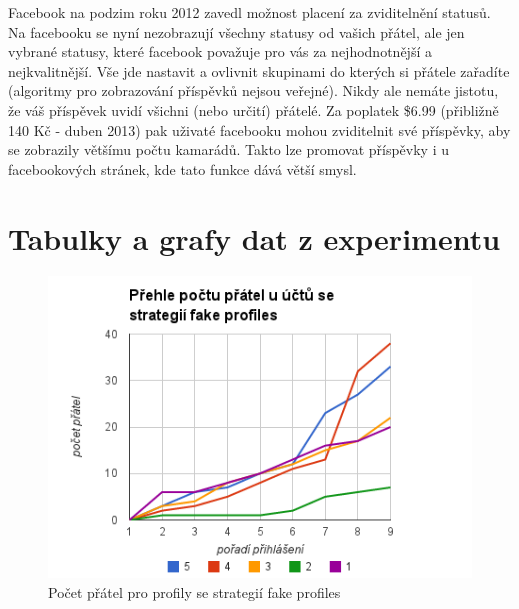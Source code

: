 \documentclass[thesis=M,czech]{FITthesis}[2013/05/10]
\begin{document}
Facebook na podzim roku 2012 zavedl možnost placení za zviditelnění statusů. Na facebooku se nyní nezobrazují všechny statusy od vašich přátel, ale jen vybrané statusy, které facebook považuje pro vás za nejhodnotnější a nejkvalitnější. Vše jde nastavit a ovlivnit skupinami do kterých si přátele zařadíte (algoritmy pro zobrazování příspěvků nejsou veřejné). Nikdy ale nemáte jistotu, že váš příspěvek uvidí všichni (nebo určití) přátelé. Za poplatek \$6.99 (přibližně 140 Kč - duben 2013) pak uživaté facebooku mohou zviditelnit své příspěvky, aby se zobrazily většímu počtu kamarádů. Takto lze promovat příspěvky i u facebookových stránek, kde tato funkce dává větší smysl.







\appendix

\chapter{Tabulky a grafy dat z experimentu}


\begin{figure}[h]
\includegraphics[width=5in]{figures/levelFake.png}
\caption{Počet přátel pro profily se strategií fake profiles}
\label{fig:levelFake}
\end{figure}
\end{document}
